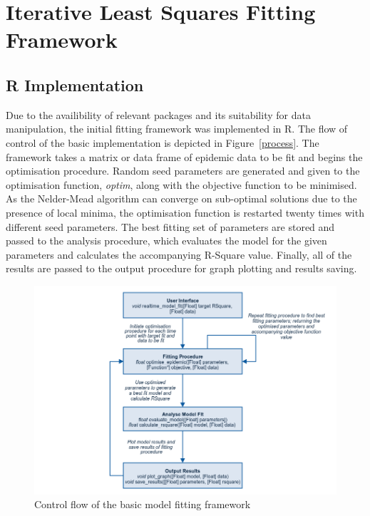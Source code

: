 \section{Iterative Least Squares Fitting Framework}
\subsection{R Implementation}
Due to the availibility of relevant packages and its suitability for
data manipulation, the initial fitting framework was implemented in
R. The flow of control of the basic implementation is depicted in
Figure~\ref{process}. The framework takes a matrix or data frame of epidemic data
to be fit and begins the optimisation procedure. Random seed
parameters are generated and given to the optimisation function,
\emph{optim}, along with the objective function to be minimised. As
the Nelder-Mead algorithm can converge on sub-optimal solutions due to
the presence of local minima, the optimisation function is restarted
twenty times with different seed parameters. The best fitting set of
parameters are stored and passed to the analysis procedure, which
evaluates the model for the given parameters and calculates the
accompanying R-Square value. Finally, all of the results are passed to
the output procedure for graph plotting and results saving.  

\begin{centering}
\begin{figure}[ht!]
  \includegraphics[width=15cm]{images/process.png}
 \caption{Control flow of the basic model fitting framework} 
\label{fig:process}
\end{figure}
\end{centering}

